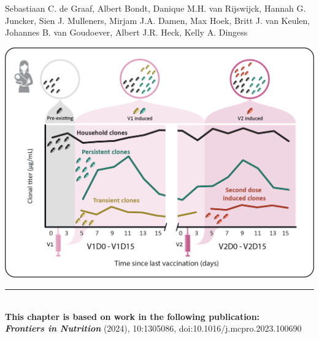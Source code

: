  \label{ch-4}
\vspace*{0.25cm}

{\footnotesize Sebastiaan C. de Graaf, Albert Bondt, Danique M.H. van Rijswijck, Hannah G. Juncker, Sien J. Mulleners, Mirjam J.A. Damen, Max Hoek, Britt J. van Keulen, Johannes B. van Goudoever, Albert J.R. Heck, Kelly A. Dingess}
\begin{center}
  \vspace{3cm}
  \includegraphics[]{Chapter.4/Figures/Ch4.png}
  \vspace{0.25cm}
\end{center}

\begin{flushleft}
  \vspace*{\fill}
  \rule{\textwidth}{1pt}\\[0cm]
  \textbf{This chapter is based on work in the following publication:}\\
  \footnotesize
  \textbf{\emph{Frontiers in Nutrition}} (2024), 10:1305086, doi:10.1016/j.mcpro.2023.100690\\
\end{flushleft}

